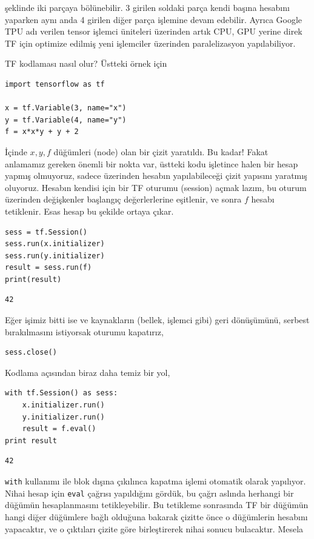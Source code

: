 \documentclass[12pt,fleqn]{article}\usepackage{../../common}
\begin{document}
şeklinde iki parçaya bölünebilir. 3 girilen soldaki parça kendi başına
hesabını yaparken aynı anda 4 girilen diğer parça işlemine devam
edebilir. Ayrıca Google TPU adı verilen tensor işlemci üniteleri üzerinden
artık CPU, GPU yerine direk TF için optimize edilmiş yeni işlemciler
üzerinden paralelizasyon yapılabiliyor.

TF kodlaması nasıl olur? Üstteki örnek için

\begin{verbatim}
import tensorflow as tf

x = tf.Variable(3, name="x")
y = tf.Variable(4, name="y")
f = x*x*y + y + 2
\end{verbatim}

İçinde $x,y,f$ düğümleri (node) olan bir çizit yaratıldı. Bu kadar! Fakat
anlamamız gereken önemli bir nokta var, üstteki kodu işletince halen bir
hesap yapmış olmuyoruz, sadece üzerinden hesabın yapılabileceği çizit
yapısını yaratmış oluyoruz. Hesabın kendisi için bir TF oturumu (session)
açmak lazım, bu oturum üzerinden değişkenler başlangıç değerlerlerine
eşitlenir, ve sonra $f$ hesabı tetiklenir. Esas hesap bu şekilde ortaya
çıkar.

\begin{verbatim}
sess = tf.Session()
sess.run(x.initializer)
sess.run(y.initializer)
result = sess.run(f)
print(result)
\end{verbatim}

\begin{verbatim}
42
\end{verbatim}

Eğer işimiz bitti ise ve kaynakların (bellek, işlemci gibi) geri
dönüşümünü, serbest bırakılmasını istiyorsak oturumu kapatırız,

\begin{verbatim}
sess.close()
\end{verbatim}

Kodlama açısından biraz daha temiz bir yol, 

\begin{verbatim}
with tf.Session() as sess:
    x.initializer.run()
    y.initializer.run()
    result = f.eval()
print result
\end{verbatim}

\begin{verbatim}
42
\end{verbatim}

\verb!with! kullanımı ile blok dışına çıkılınca kapatma işlemi otomatik
olarak yapılıyor. Nihai hesap için \verb!eval! çağrısı yapıldığını gördük,
bu çağrı aslında herhangi bir düğümün hesaplanmasını tetikleyebilir. Bu
tetikleme sonrasında TF bir düğümün hangi diğer düğümlere bağlı olduğuna
bakarak çizitte önce o düğümlerin hesabını yapacaktır, ve o çıktıları
çizite göre birleştirerek nihai sonucu bulacaktır. Mesela
\end{document}
